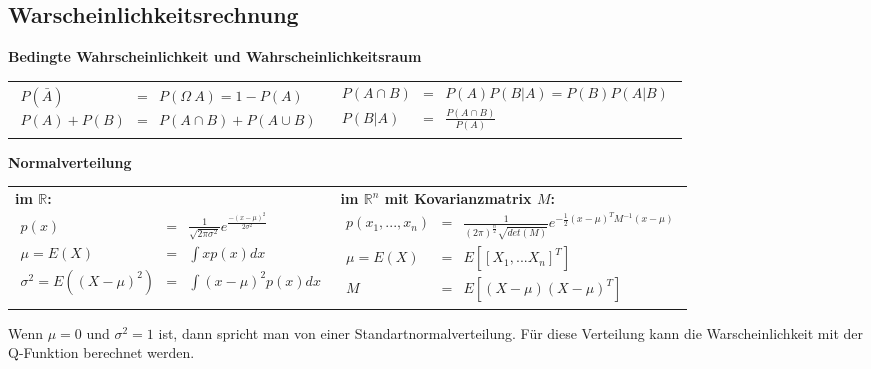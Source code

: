 \subsection{Warscheinlichkeitsrechnung}
\begin{center}
\textbf{Bedingte Wahrscheinlichkeit und Wahrscheinlichkeitsraum}
\end{center}
\begin{tabular}{ll}
 \addtolength{\jot}{2mm}
 \parbox{6cm}{
 \begin{eqnarray*}
 P(\bar{A}) &=& P(\Omega \ A) = 1- P(A)\\
 P(A) + P(B) &=& P(A \cap B) + P(A \cup B)
 \end{eqnarray*}}
 &
 \addtolength{\jot}{2mm}
 \parbox{5cm}{
 \begin{eqnarray*}
 P(A \cap B) &=& P(A)P(B \vert A) = P(B) P(A \vert B)\\
 P(B \vert A) &=& \frac{P(A \cap B)}{P(A)}
 \end{eqnarray*}}
\end{tabular}
\vspace{6pt}
\begin{center}
\textbf{Normalverteilung}
\end{center}
\begin{tabular}{ll}
 \addtolength{\jot}{2mm}
 \parbox{6cm}{
 \textbf{im $\mathbb{R}$: }
 \begin{eqnarray*}
 p(x) &=& \frac{1}{\sqrt{2 \pi \sigma^2}} e^{\frac{-(x-\mu)^2}{2 \sigma^2}}\\
\mu = E(X) &=& \int x p(x) dx \\
\sigma^2 = E((X-\mu)^2) &=& \int (x- \mu)^2 p(x) dx
 \end{eqnarray*}}
 &
 \addtolength{\jot}{2mm}
 \parbox{6cm}{
 \textbf{im $\mathbb{R}^n$ mit Kovarianzmatrix $M$: }
 \begin{eqnarray*}
 p(x_1, ... ,x_n) &=& \frac{1}{(2\pi)^{\frac{n}{2}} \sqrt{det(M)}} e^{-\frac{1}{2}(x- \mu)^T M^{-1}(x-\mu)}\\
\mu = E(X) &=& E \left[ [X_1, ... X_n]^T  \right]  \\
M &=& E \left[ (X- \mu) (X- \mu)^T \right]
\end{eqnarray*}}
\end{tabular}
Wenn $\mu = 0$ und $\sigma^2 = 1$ ist, dann spricht man von einer Standartnormalverteilung. Für diese Verteilung kann die Warscheinlichkeit mit der Q-Funktion berechnet werden.
